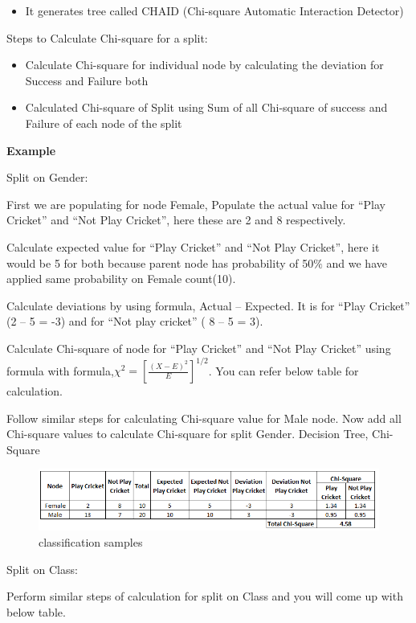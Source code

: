 \begin{enumerate}
\begin{itemize}
\item  It generates tree called CHAID (Chi-square Automatic Interaction Detector)
\end{itemize}


Steps to Calculate Chi-square for a split:

\begin{itemize}
\item Calculate Chi-square for individual node by calculating the deviation for Success and Failure both
\item Calculated Chi-square of Split using Sum of all Chi-square of success and Failure of each node of the split
\end{itemize}

\textbf{Example} 

Split on Gender:

First we are populating for node Female, Populate the actual value for “Play Cricket” and “Not Play Cricket”, here these are 2 and 8 respectively.

Calculate expected value for “Play Cricket” and “Not Play Cricket”, here it would be 5 for both because parent node has probability of 50$\%$ and we have applied same probability on Female count(10).

Calculate deviations by using formula, Actual – Expected. It is for “Play Cricket” (2 – 5 = -3) and for “Not play cricket” ( 8 – 5 = 3).

Calculate Chi-square of node for “Play Cricket” and “Not Play Cricket” using formula with formula,$\chi^{2} =  \left [ \frac{ (X - E)^2}{E}\right ]^{1/2}$. You can refer below table for calculation.

Follow similar steps for calculating Chi-square value for Male node.
Now add all Chi-square values to calculate Chi-square for split Gender.
Decision Tree, Chi-Square

\begin{figure}[H]
\centering
\includegraphics[width=0.9\columnwidth]{./pic/table-1.png}
\caption{classification samples}
\end{figure}


Split on Class:

Perform similar steps of calculation for split on Class and you will come up with below table.


\end{enumerate}
